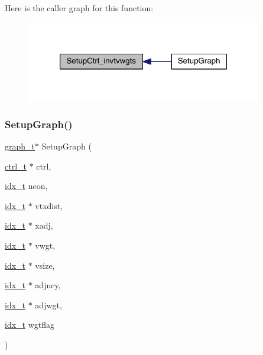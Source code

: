 Here is the caller graph for this function\+:\nopagebreak
\begin{figure}[H]
\begin{center}
\leavevmode
\includegraphics[width=292pt]{a00951_addb1218f833155110864d49f0d1879ab_icgraph}
\end{center}
\end{figure}
\mbox{\label{a00951_a010e2ad3dd68ae816d481fdcd4260583}} 
\subsubsection{\texorpdfstring{Setup\+Graph()}{SetupGraph()}}
{\footnotesize\ttfamily \hyperlink{a00734}{graph\+\_\+t}$\ast$ Setup\+Graph (\begin{DoxyParamCaption}\item[{\hyperlink{a00742}{ctrl\+\_\+t} $\ast$}]{ctrl,  }\item[{\hyperlink{a00876_aaa5262be3e700770163401acb0150f52}{idx\+\_\+t}}]{ncon,  }\item[{\hyperlink{a00876_aaa5262be3e700770163401acb0150f52}{idx\+\_\+t} $\ast$}]{vtxdist,  }\item[{\hyperlink{a00876_aaa5262be3e700770163401acb0150f52}{idx\+\_\+t} $\ast$}]{xadj,  }\item[{\hyperlink{a00876_aaa5262be3e700770163401acb0150f52}{idx\+\_\+t} $\ast$}]{vwgt,  }\item[{\hyperlink{a00876_aaa5262be3e700770163401acb0150f52}{idx\+\_\+t} $\ast$}]{vsize,  }\item[{\hyperlink{a00876_aaa5262be3e700770163401acb0150f52}{idx\+\_\+t} $\ast$}]{adjncy,  }\item[{\hyperlink{a00876_aaa5262be3e700770163401acb0150f52}{idx\+\_\+t} $\ast$}]{adjwgt,  }\item[{\hyperlink{a00876_aaa5262be3e700770163401acb0150f52}{idx\+\_\+t}}]{wgtflag }\end{DoxyParamCaption})}

